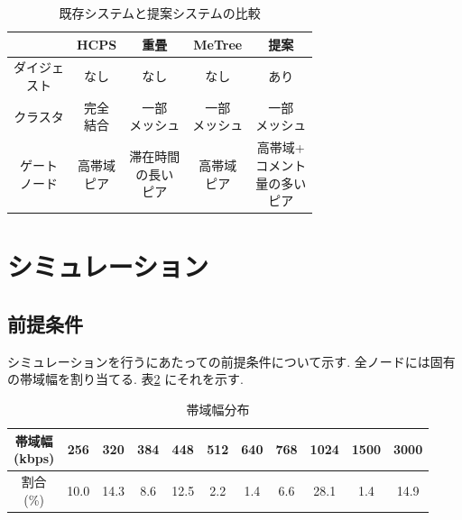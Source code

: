 \documentclass[letter]{ieicej}
\begin{document}
\begin{table}[h]

  \centering

\vspace*{0.3cm}
\caption{既存システムと提案システムの比較 \label{tb:tb1}}
  \begin{tabular}{|c|c|c|c|c|} \hline
     & HCPS & 重畳 & MeTree & 提案 \\ \hline
    \shortstack{ダイジェ \\ スト} & なし & なし & なし & あり\\ \hline
        クラスタ & \shortstack{完全 \\ 結合} & \shortstack{一部 \\ メッシュ} & \shortstack{一部 \\ メッシュ}  & \shortstack{一部 \\ メッシュ}\\
     \hline
     \shortstack{ゲート \\ ノード} & \shortstack{高帯域 \\ ピア} & \shortstack{滞在時間 \\ の長い \\ ピア} & \shortstack{高帯域 \\ ピア} & \shortstack{高帯域+ \\ コメント \\ 量の多い \\ ピア} \\
     \hline
  \end{tabular}
\end{table}

\section{シミュレーション}
\subsection{前提条件}
シミュレーションを行うにあたっての前提条件について示す. 全ノードには固有の帯域幅を割り当てる. 表\ref{tb:tb2} にそれを示す.

\begin{table}[h]

  \centering

\vspace*{0.3cm}
\caption{帯域幅分布 \label{tb:tb2}}
\begin{tabular}{|c|c|c|c|c|c|c|c|c|c|c|} \hline
    \shortstack{帯域幅 \\ (kbps)} & 256 & 320 & 384 & 448 & 512 & 640 & 768 & 1024 & 1500 & 3000 \\ \hline
    \shortstack{割合 \\ (\%)} & 10.0 & 14.3 & 8.6 & 12.5 & 2.2 & 1.4 & 6.6 & 28.1 & 1.4 & 14.9 \\ \hline
  \end{tabular}
\end{table}
\end{document}
